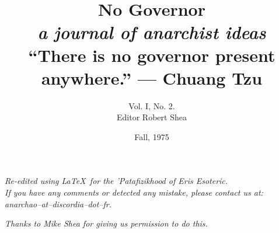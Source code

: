 \documentclass[12pt, onecolumn, letterpaper, oneside]{book}
\title{No Governor\\
		\large \textit{a journal of anarchist ideas}\\
		\vspace{2\baselineskip}
		\normalsize ``There is no governor present anywhere.'' --- Chuang Tzu
		}
\author{Vol. I, No. 2.\\Editor Robert Shea}
\date{Fall, 1975}
\begin{document}
\sloppy

\maketitle

\vspace*{\fill}

\begin{flushright}
\emph{Re-edited using \LaTeX $\,$ for the 'Patafizikhood of Eris Esoteric.\\
If you have any comments or detected any mistake, please contact us at:\\
anarchao--at--discordia--dot--fr.\\}
\end{flushright}

\begin{flushright}
\emph{Thanks to Mike Shea for giving us permission to do this.}
\end{flushright}

\vspace*{\fill}

\tableofcontents














\end{document}
